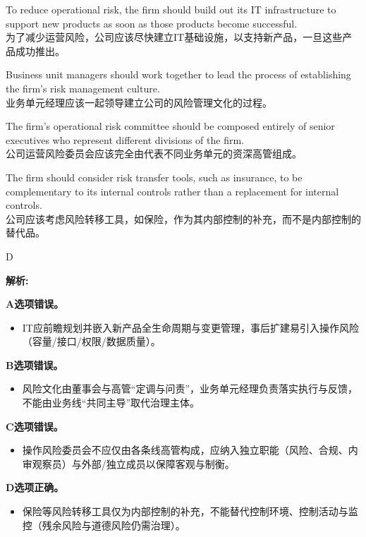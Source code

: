 \documentclass{article}
\newenvironment{explanation}
{\textbf{解析:}\par}
{\par}
\begin{document}
\begin{choices}
    \item To reduce operational risk, the firm should build out its IT infrastructure to support new products as soon as those products become successful.\\为了减少运营风险，公司应该尽快建立IT基础设施，以支持新产品，一旦这些产品成功推出。
    \item Business unit managers should work together to lead the process of establishing the firm's risk management culture.\\业务单元经理应该一起领导建立公司的风险管理文化的过程。
    \item The firm's operational risk committee should be composed entirely of senior executives who represent different divisions of the firm.\\公司运营风险委员会应该完全由代表不同业务单元的资深高管组成。
    \item The firm should consider risk transfer tools, such as insurance, to be complementary to its internal controls rather than a replacement for internal controls.\\公司应该考虑风险转移工具，如保险，作为其内部控制的补充，而不是内部控制的替代品。
\end{choices}

\begin{correctanswer}
    D
\end{correctanswer}

\begin{explanation}
    \textbf{A选项错误。}
    \begin{itemize}
        \item IT应前瞻规划并嵌入新产品全生命周期与变更管理，事后扩建易引入操作风险（容量/接口/权限/数据质量）。
    \end{itemize}

    \textbf{B选项错误。}
    \begin{itemize}
        \item 风险文化由董事会与高管“定调与问责”，业务单元经理负责落实执行与反馈，不能由业务线“共同主导”取代治理主体。
    \end{itemize}

    \textbf{C选项错误。}
    \begin{itemize}
        \item 操作风险委员会不应仅由各条线高管构成，应纳入独立职能（风险、合规、内审观察员）与外部/独立成员以保障客观与制衡。
    \end{itemize}

    \textbf{D选项正确。}
    \begin{itemize}
        \item 保险等风险转移工具仅为内部控制的补充，不能替代控制环境、控制活动与监控（残余风险与道德风险仍需治理）。
    \end{itemize}
\end{explanation}
\end{document}
